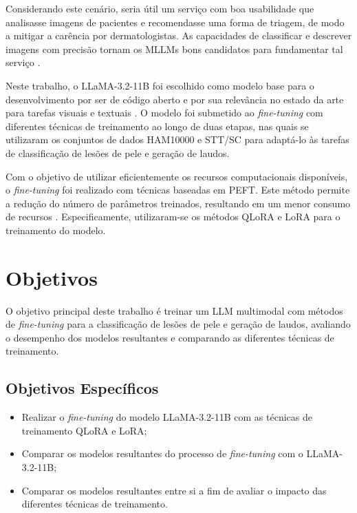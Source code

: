 Considerando este cenário, seria útil um serviço com boa usabilidade que analisasse imagens de pacientes e recomendasse
uma forma de triagem, de modo a mitigar a carência por dermatologistas. As capacidades de classificar e descrever
imagens com precisão tornam os \acp{MLLM} bons candidatos para fundamentar tal serviço \cite{mllm_success_rate}.

Neste trabalho, o \ac{LLaMA}-3.2-11B foi escolhido como modelo base para o desenvolvimento por ser de código aberto e
por sua relevância no estado da arte para tarefas visuais e textuais \cite{dubey2024llama}. O modelo foi submetido ao
\textit{fine-tuning} com diferentes técnicas de treinamento ao longo de duas etapas, nas quais se utilizaram os
conjuntos de dados \ac{HAM10000} e \ac{STT/SC} para adaptá-lo às tarefas de classificação de lesões de pele e geração
de laudos.

Com o objetivo de utilizar eficientemente os recursos computacionais disponíveis, o \textit{fine-tuning} foi realizado
com técnicas baseadas em \ac{PEFT}. Este método permite a redução do número de parâmetros treinados, resultando em um
menor consumo de recursos \cite{peft}. Especificamente, utilizaram-se os métodos \ac{QLoRA} e \ac{LoRA} para o
treinamento do modelo.

\section{Objetivos}

O objetivo principal deste trabalho é treinar um \ac{LLM} multimodal com métodos de \textit{fine-tuning} para a
classificação de lesões de pele e geração de laudos, avaliando o desempenho dos modelos resultantes e comparando as
diferentes técnicas de treinamento.

\subsection*{Objetivos Específicos}

\begin{itemize}
    \item Realizar o \textit{fine-tuning} do modelo \ac{LLaMA}-3.2-11B com as técnicas de treinamento \ac{QLoRA} e
          \ac{LoRA};
    \item Comparar os modelos resultantes do processo de \textit{fine-tuning} com o \ac{LLaMA}-3.2-11B;
    \item Comparar os modelos resultantes entre si a fim de avaliar o impacto das diferentes técnicas de treinamento.
\end{itemize}

